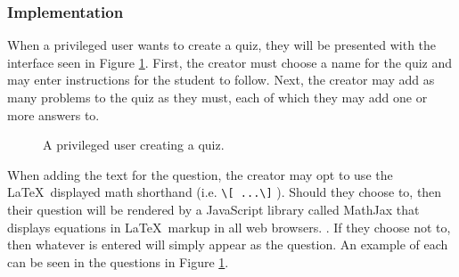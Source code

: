 \subsubsection{Implementation}
When a privileged user wants to create a quiz, they will be presented with the interface seen in Figure \ref{fig:screens-quiz-new}. First, the creator must choose a name for the quiz and may enter instructions for the student to follow. Next, the creator may add as many problems to the quiz as they must, each of which they may add one or more answers to.

\begin{figure}[p!]
	\centering
	\caption{A privileged user creating a quiz.}
	\label{fig:screens-quiz-new}
\end{figure}

When adding the text for the question, the creator may opt to use the \LaTeX\ displayed math shorthand (i.e. \texttt{\textbackslash [ ...\textbackslash ]} ). Should they choose to, then their question will be rendered by a JavaScript library called MathJax that displays equations in \LaTeX\ markup in all web browsers. \cite{mathjax-webpage}. If they choose not to, then whatever is entered will simply appear as the question. An example of each can be seen in the questions in Figure \ref{fig:screens-quiz-new}.

